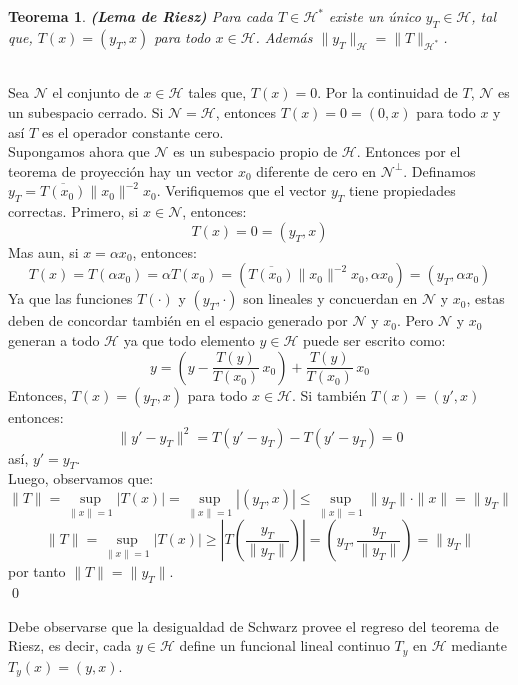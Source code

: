 \documentclass[12pt]{book}
\numberwithin{equation}{chapter}
\newtheorem{theorem}{Teorema}[chapter]
\def\n{\noindent}
\def\ol{\overline}
\def\H{\mathcal{H}}
\def\N{\mathcal{N}}
\begin{document}
\begin{theorem} {\bf (Lema de Riesz)} 
Para cada $T \in \H^{*}$ existe un \'unico $y_{T} \in \H$, tal que, $ T(x)=(y_{T},x) $ para todo $x \in \H$. Adem\'as $\|y_{T}\|_{\H}= \| T \|_{\H^{*}} $.
\end{theorem}
\n {\bf Demostraci\'on}\\
Sea $\N$ el conjunto de $x \in \H$ tales que, $T(x)=0$. Por la continuidad de $T$, $\N$ es un subespacio cerrado. Si $\N = \H$, entonces $T(x)=0=(0,x)$ para todo $x$ y as\'i $T$ es el operador constante cero. \\
Supongamos ahora que $\N$ es un subespacio propio de $\H$. Entonces por el teorema de proyecci\'on hay un vector $x_{0}$ diferente de cero en $\N^{\perp}$. Definamos $y_{T}= \ol{T(x_{0})} \|x_{0}\|^{-2} x_{0} $. Verifiquemos que el vector $y_{T}$ tiene propiedades correctas. Primero, si $x \in \N$, entonces:
$$ T(x)=0=(y_{T},x) $$
Mas aun, si $x = \alpha x_{0}$, entonces:
$$ T(x)= T(\alpha x_{0})= \alpha T(x_{0})= \left(\ol{T(x_{0})} \|x_{0}\|^{-2} x_{0}, \alpha x_{0}  \right)= (y_{T}, \alpha x_{0}) $$
Ya que las funciones $T(\cdot)$ y $(y_{T},\cdot)$ son lineales y concuerdan en $\N$ y $x_{0}$, estas deben de concordar tambi\'en en el espacio generado por $\N$ y $x_{0}$. Pero $\N$ y $x_{0}$ generan a todo $\H$ ya que todo elemento $y \in \H$ puede ser escrito como:
$$ y= \left( y - \frac{T(y)}{T(x_{0})}\, x_{0} \right) + \frac{T(y)}{T(x_{0})}\, x_{0}  $$
Entonces, $ T(x)= (y_{T},x) $ para todo $x \in \H$. Si tambi\'en $ T(x)= (y',x) $ entonces:
$$ \| y'-y_{T} \|^{2}= T(y'-y_{T}) - T(y'-y_{T}) = 0$$
as\'i, $y'=y_{T}$. \\
Luego, observamos que:
$$ \|T\|= \sup_{\|x\|=1} |T(x)| = \sup_{\|x\|=1} |(y_{T},x)| \leq \sup_{\|x\|=1} \|y_{T}\| \cdot \|x\|= \|y_{T}\| $$
$$ \|T\| = \sup_{\|x\|=1} |T(x)| \geq \left| T \left( \frac{y_{T}}{\|y_{T}\|} \right) \right|= \left( y_{T},\frac{y_{T}}{\|y_{T}\|}  \right) = \|y_{T}\| $$
por tanto $\|T\|= \| y_{T} \|$. \\ \qed

\vspace{5 mm}

Debe observarse que la desigualdad de Schwarz provee el regreso del teorema de Riesz, es decir, cada $y \in \H$ define un funcional lineal continuo $T_{y}$ en $\H$ mediante $T_{y}(x)= (y,x)$.

\newpage
\end{document}
